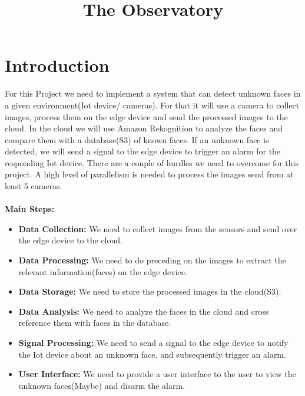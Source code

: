 \documentclass[conference]{IEEEtran}
\begin{document}
\title{The Observatory}

\author{
\and
{}
}

\maketitle

\section{Introduction}
For this Project we need to implement a system that can detect unknown faces in a given environment(Iot device/ cameras). For that it will
use a camera to collect images, process them on the edge device and send the processed images to the cloud. In the cloud
we will use Amazon Rekognition to analyze the faces and compare them with a database(S3) of known faces. If an unknown face
is detected, we will send a signal to the edge device to trigger an alarm for the responding Iot device.
There are a couple of hurdles we need to overcome for this project. A high level of parallelism is needed to process the images
send from at least 5 cameras.\\
\\
\textbf{Main Steps:}
\begin{itemize}
    \item \textbf{Data Collection:} We need to collect images from the sensors and send over the edge device to the cloud.
    \item \textbf{Data Processing:} We need to do preceding on the images to extract the relevant information(faces) on the edge device.
    \item \textbf{Data Storage:} We need to store the processed images in the cloud(S3).
    \item \textbf{Data Analysis:} We need to analyze the faces in the cloud and cross reference them with faces in the database.
    \item \textbf{Signal Processing:} We need to send a signal to the edge device to notify the Iot device about an unknown face, and subsequently trigger an alarm.
    \item \textbf{User Interface:} We need to provide a user interface to the user to view the unknown faces(Maybe) and disarm the alarm.
\end{itemize}
\end{document}
